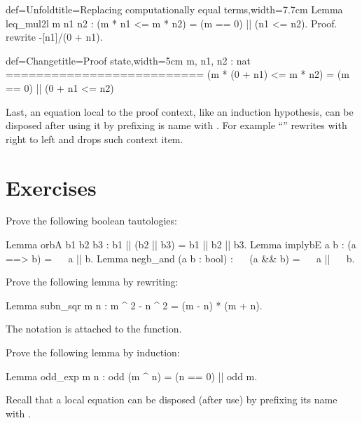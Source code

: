 \begin{coq}{def=Unfold}{title=Replacing computationally equal terms,width=7.7cm}
Lemma leq_mul2l m n1 n2 :
(m * n1 <= m * n2) = (m == 0) || (n1 <= n2).
Proof.
rewrite -[n1]/(0 + n1).
\end{coq}
\begin{coqout}{def=Change}{title=Proof state,width=5cm}
m, n1, n2 : nat
==========================
(m * (0 + n1) <= m * n2) =
(m == 0) || (0 + n1 <= n2)
\end{coqout}

Last, an equation local to the proof context, like an
induction hypothesis, can be disposed after using it by
prefixing is name with \C{\{\}}.  For example
``'' rewrites with  right to
left and drops such context item.

\newpage
\section{Exercises}

\begin{Exercise}[label=ex:boolid,difficulty=0,title={Truth tables}]

Prove the following boolean tautologies:

\begin{coq}{}{}
Lemma orbA b1 b2 b3 : b1 || (b2 || b3) = b1 || b2 || b3.
Lemma implybE a b : (a ==> b) = ~~ a || b.
Lemma negb_and (a b : bool) : ~~ (a && b) = ~~ a || ~~ b.
\end{coq}

\end{Exercise}

\begin{Exercise}[label=ex:rewrite,difficulty=0,title={Rewriting}]

Prove the following lemma by rewriting:

\begin{coq}{}{}
Lemma subn_sqr m n : m ^ 2 - n ^ 2 = (m - n) * (m + n).
\end{coq}
The \C{(_ ^ _)} notation is attached to the  function.

\end{Exercise}

\begin{Exercise}[label=ex:induction,difficulty=1,title={Induction}]

Prove the following lemma by induction:

\begin{coq}{}{}
Lemma odd_exp m n : odd (m ^ n) = (n == 0) || odd m.
\end{coq}
Recall that a local equation can be disposed (after use)
by prefixing its name with \C{\{\}}.

\end{Exercise}


